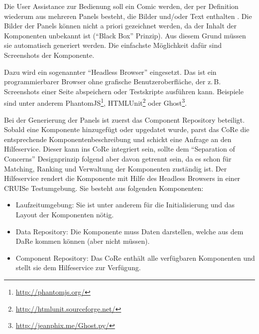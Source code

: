 \documentclass[
	headsepline,
	footsepline,
	fontsize=12pt,
	bibliography=totoc
]{scrbook}
\begin{document}

Die User Assistance zur Bedienung soll ein Comic werden, der per Definition wiederum aus mehreren Panels besteht, die Bilder und/oder Text enthalten \cite{McCloud1994}. Die Bilder der Panels können nicht a priori gezeichnet werden, da der Inhalt der Komponenten unbekannt ist (\enquote{Black Box} Prinzip). Aus diesem Grund müssen sie automatisch generiert werden. Die einfachste Möglichkeit dafür sind Screenshots der Komponente.


Dazu wird ein sogenannter \enquote{Headless Browser} eingesetzt. Das ist ein programmierbarer Browser ohne grafische Benutzeroberfläche, der z.\,B. Screenshots einer Seite abspeichern oder Testskripte ausführen kann. Beispiele sind unter anderem PhantomJS\footnote{\url{http://phantomjs.org/}}, HTMLUnit\footnote{\url{http://htmlunit.sourceforge.net/}} oder Ghost\footnote{\url{http://jeanphix.me/Ghost.py/}}.


Bei der Generierung der Panels ist zuerst das Component Repository beteiligt. Sobald eine Komponente hinzugefügt oder upgedatet wurde, parst das CoRe die entsprechende Komponentenbeschreibung und schickt eine Anfrage an den Hilfeservice. Dieser kann ins CoRe integriert sein, sollte dem \enquote{Separation of Concerns} Designprinzip folgend aber davon getrennt sein, da es schon für Matching, Ranking und Verwaltung der Komponenten zuständig ist. Der Hilfeservice rendert die Komponente mit Hilfe des Headless Browsers in einer CRUISe Testumgebung. Sie besteht aus folgenden Komponenten:

\begin{itemize}
	\item Laufzeitumgebung: Sie ist unter anderem für die Initialisierung und das Layout der Komponenten nötig.
	\item Data Repository: Die Komponente muss Daten darstellen, welche aus dem DaRe kommen können (aber nicht müssen).
	\item Component Repository: Das CoRe enthält alle verfügbaren Komponenten und stellt sie dem Hilfeservice zur Verfügung.
\end{itemize}
\end{document}
